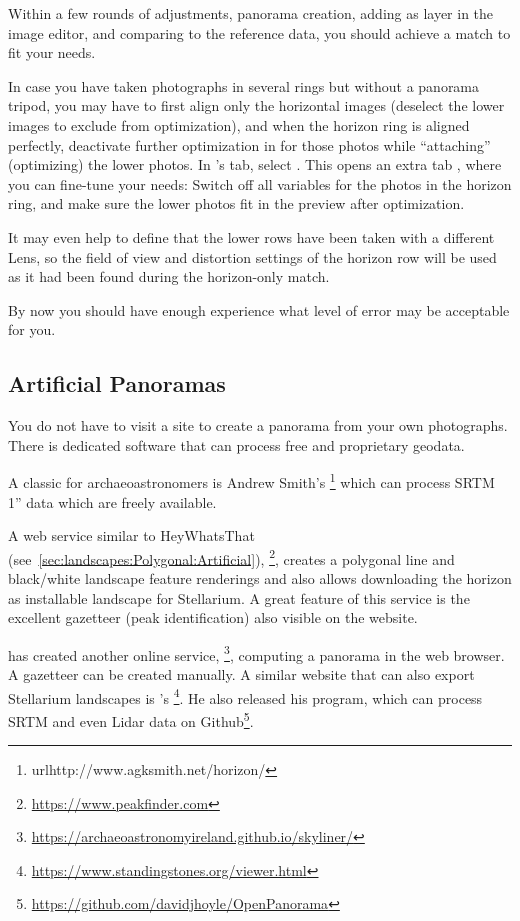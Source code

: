 Within a few rounds of adjustments, panorama creation, adding as layer
in the image editor, and comparing to the reference data, you should
achieve a match to fit your needs.

In case you have taken photographs in several rings but without a panorama tripod, you may have to
first align only the horizontal images (deselect the lower images to
exclude from optimization), and when the horizon ring is aligned
perfectly, deactivate further optimization in  for those photos
while ``attaching'' (optimizing) the lower photos. In 's  tab,
select . This opens an
extra tab , where you can fine-tune your needs: Switch
off all variables for the photos in the horizon ring, and make sure
the lower photos fit in the preview after optimization.

It may even help to define that the lower rows have been taken with a
different Lens, so the field of view and distortion settings of the
horizon row will be used as it had been found during the horizon-only
match.

By now you should have
enough experience what level of error may be acceptable for you.


\subsection{Artificial Panoramas}
\label{sec:landscapes:Artificial}

You do not have to visit a site to create a panorama from your own photographs. There is dedicated software that can process free and proprietary geodata.

A classic for archaeoastronomers is Andrew Smith's \footnote{url{http://www.agksmith.net/horizon/}} which can process SRTM 1'' data which are freely available.

A web service similar to HeyWhatsThat (see~\ref{sec:landscapes:Polygonal:Artificial}), 
\footnote{\url{https://www.peakfinder.com}}, 
creates a polygonal line and black/white landscape feature renderings and also allows downloading the horizon as installable landscape for Stellarium. 
A great feature of this service is the excellent gazetteer (peak identification) also visible on the website.

 has created another online service, \footnote{\url{https://archaeoastronomyireland.github.io/skyliner/}}, 
computing a panorama in the web browser. A gazetteer can be created manually. 
A similar website that can also export Stellarium landscapes is 's \footnote{\url{https://www.standingstones.org/viewer.html}}. 
He also released his program, which can process SRTM and even Lidar data on Github\footnote{\url{https://github.com/davidjhoyle/OpenPanorama}}.



